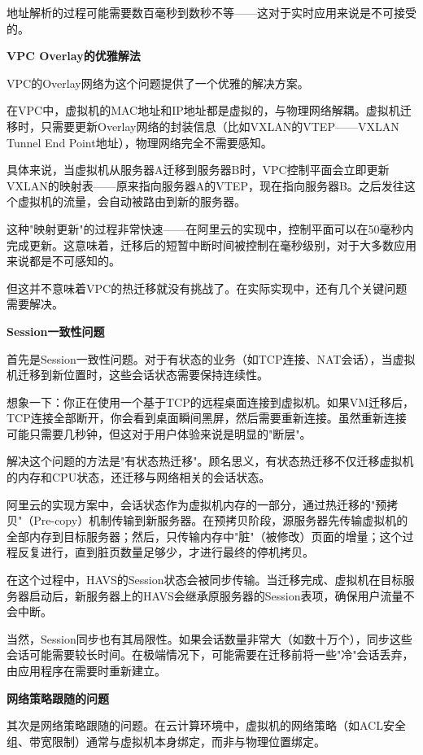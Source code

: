 地址解析的过程可能需要数百毫秒到数秒不等——这对于实时应用来说是不可接受的。

\textbf{VPC Overlay的优雅解法}

VPC的Overlay网络为这个问题提供了一个优雅的解决方案。

在VPC中，虚拟机的MAC地址和IP地址都是虚拟的，与物理网络解耦。虚拟机迁移时，只需要更新Overlay网络的封装信息（比如VXLAN的VTEP——VXLAN Tunnel End Point地址），物理网络完全不需要感知。

具体来说，当虚拟机从服务器A迁移到服务器B时，VPC控制平面会立即更新VXLAN的映射表——原来指向服务器A的VTEP，现在指向服务器B。之后发往这个虚拟机的流量，会自动被路由到新的服务器。

这种"映射更新"的过程非常快速——在阿里云的实现中，控制平面可以在50毫秒内完成更新。这意味着，迁移后的短暂中断时间被控制在毫秒级别，对于大多数应用来说都是不可感知的。

但这并不意味着VPC的热迁移就没有挑战了。在实际实现中，还有几个关键问题需要解决。

\textbf{Session一致性问题}

首先是Session一致性问题。对于有状态的业务（如TCP连接、NAT会话），当虚拟机迁移到新位置时，这些会话状态需要保持连续性。

想象一下：你正在使用一个基于TCP的远程桌面连接到虚拟机。如果VM迁移后，TCP连接全部断开，你会看到桌面瞬间黑屏，然后需要重新连接。虽然重新连接可能只需要几秒钟，但这对于用户体验来说是明显的"断层"。

解决这个问题的方法是"有状态热迁移"。顾名思义，有状态热迁移不仅迁移虚拟机的内存和CPU状态，还迁移与网络相关的会话状态。

阿里云的实现方案中，会话状态作为虚拟机内存的一部分，通过热迁移的"预拷贝"（Pre-copy）机制传输到新服务器。在预拷贝阶段，源服务器先传输虚拟机的全部内存到目标服务器；然后，只传输内存中"脏"（被修改）页面的增量；这个过程反复进行，直到脏页数量足够少，才进行最终的停机拷贝。

在这个过程中，HAVS的Session状态会被同步传输。当迁移完成、虚拟机在目标服务器启动后，新服务器上的HAVS会继承原服务器的Session表项，确保用户流量不会中断。

当然，Session同步也有其局限性。如果会话数量非常大（如数十万个），同步这些会话可能需要较长时间。在极端情况下，可能需要在迁移前将一些"冷"会话丢弃，由应用程序在需要时重新建立。

\textbf{网络策略跟随的问题}

其次是网络策略跟随的问题。在云计算环境中，虚拟机的网络策略（如ACL安全组、带宽限制）通常与虚拟机本身绑定，而非与物理位置绑定。

